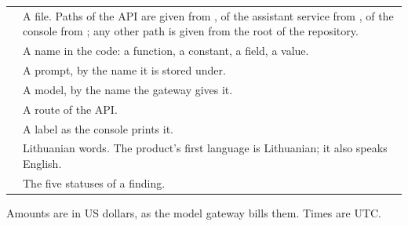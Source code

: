 \begin{tabularx}{\textwidth}{@{}L{44mm}Y@{}}
  \toprule
   &  \\
  \midrule
   & A file. Paths of the API are given from , of the assistant service from , of the console from ; any other path is given from the root of the repository. \\
   & A name in the code: a function, a constant, a field, a value. \\
   & A prompt, by the name it is stored under. \\
   & A model, by the name the gateway gives it. \\
   & A route of the API. \\
   & A label as the console prints it. \\
   & Lithuanian words. The product's first language is Lithuanian; it also speaks English. \\
       & The five statuses of a finding. \\
  \bottomrule
\end{tabularx}

Amounts are in US dollars, as the model gateway bills them. Times are UTC.
